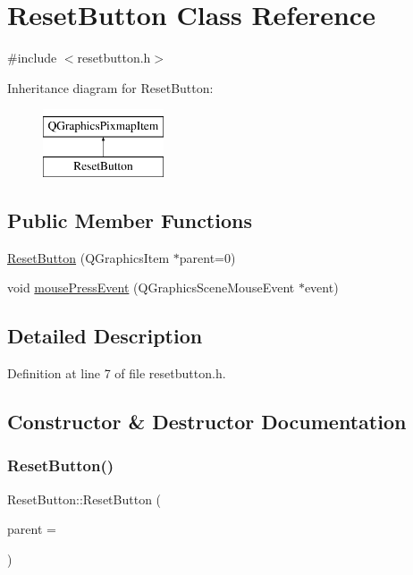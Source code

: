 \hypertarget{class_reset_button}{}\section{Reset\+Button Class Reference}
\label{class_reset_button}


{\ttfamily \#include $<$resetbutton.\+h$>$}

Inheritance diagram for Reset\+Button\+:\begin{figure}[H]
\begin{center}
\leavevmode
\includegraphics[height=2.000000cm]{class_reset_button}
\end{center}
\end{figure}
\subsection*{Public Member Functions}
\begin{DoxyCompactItemize}
\item 
\hyperlink{class_reset_button_a41e9f93c9b7f758d1791dad20f6a5451}{Reset\+Button} (Q\+Graphics\+Item $\ast$parent=0)
\item 
void \hyperlink{class_reset_button_a21e661fcbc9e266ee9fa76a9feba8401}{mouse\+Press\+Event} (Q\+Graphics\+Scene\+Mouse\+Event $\ast$event)
\end{DoxyCompactItemize}


\subsection{Detailed Description}


Definition at line 7 of file resetbutton.\+h.



\subsection{Constructor \& Destructor Documentation}
\mbox{\label{class_reset_button_a41e9f93c9b7f758d1791dad20f6a5451}} 
\subsubsection{\texorpdfstring{Reset\+Button()}{ResetButton()}}
{\footnotesize\ttfamily Reset\+Button\+::\+Reset\+Button (\begin{DoxyParamCaption}\item[{Q\+Graphics\+Item $\ast$}]{parent = {} }\end{DoxyParamCaption})}



